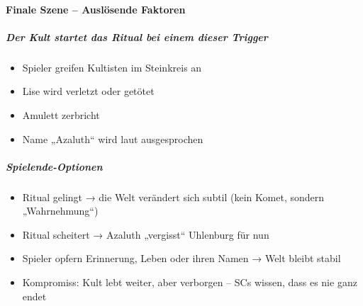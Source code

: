 \paragraph{Finale Szene – Auslösende Faktoren}
\subparagraph{Der Kult startet das Ritual bei einem dieser Trigger}
\begin{itemize}
\item Spieler greifen Kultisten im Steinkreis an
\item Lise wird verletzt oder getötet
\item Amulett zerbricht
\item Name „Azaluth“ wird laut ausgesprochen
\end{itemize}
\subparagraph{Spielende-Optionen}
\begin{itemize}
\item Ritual gelingt → die Welt verändert sich subtil (kein Komet, sondern „Wahrnehmung“)
\item Ritual scheitert → Azaluth „vergisst“ Uhlenburg für nun
\item Spieler opfern Erinnerung, Leben oder ihren Namen → Welt bleibt stabil
\item Kompromiss: Kult lebt weiter, aber verborgen – SCs wissen, dass es nie ganz endet
\end{itemize}